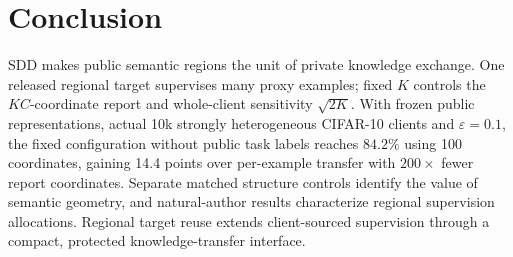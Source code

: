 \section{Conclusion}
\label{sec:conclusion}

SDD makes public semantic regions the unit of private knowledge exchange.
One released regional target supervises many proxy examples; fixed $K$
controls the $KC$-coordinate report and whole-client sensitivity
$\sqrt{2K}$. With frozen public representations, actual 10k strongly
heterogeneous CIFAR-10 clients and $\varepsilon=0.1$, the fixed configuration
without public task labels reaches $84.2\%$ using 100 coordinates, gaining
14.4 points over per-example transfer with $200\times$ fewer report
coordinates. Separate matched structure controls identify the value of
semantic geometry, and natural-author results characterize regional
supervision allocations. Regional target reuse extends client-sourced
supervision through a compact, protected knowledge-transfer interface.
